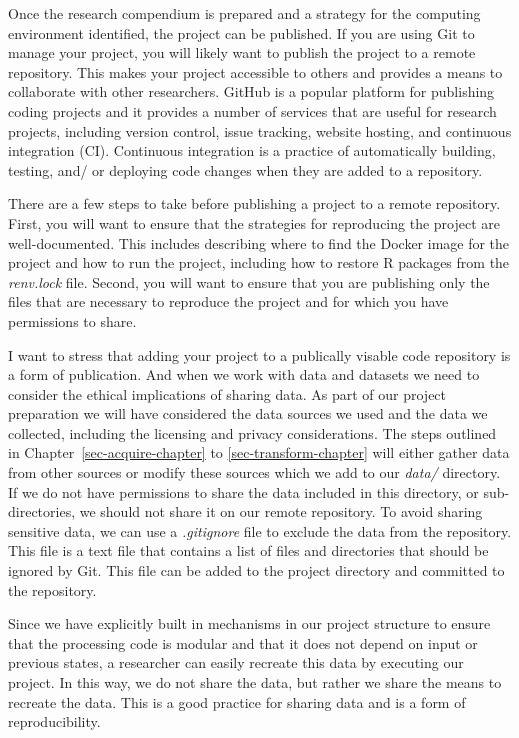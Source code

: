 \documentclass[
  letterpaper,
  krantz1]{latex/krantz-mod}
\theoremstyle{definition}
\theoremstyle{definition}
\theoremstyle{remark}
\begin{document}
Once the research compendium is prepared and a strategy for the
computing environment identified, the project can be published. If you
are using Git to manage your project, you will likely want to publish
the project to a remote repository. This makes your project accessible
to others and provides a means to collaborate with other researchers.
GitHub is a popular platform for publishing coding projects and it
provides a number of services that are useful for research projects,
including version control, issue tracking, website hosting, and
continuous integration (CI). Continuous integration is a practice of
automatically building, testing, and/ or deploying code changes when
they are added to a repository.

There are a few steps to take before publishing a project to a remote
repository. First, you will want to ensure that the strategies for
reproducing the project are well-documented. This includes describing
where to find the Docker image for the project and how to run the
project, including how to restore R packages from the \emph{renv.lock}
file. Second, you will want to ensure that you are publishing only the
files that are necessary to reproduce the project and for which you have
permissions to share.

I want to stress that adding your project to a publically visable code
repository is a form of publication. And when we work with data and
datasets we need to consider the ethical implications of sharing data.
As part of our project preparation we will have considered the data
sources we used and the data we collected, including the licensing and
privacy considerations. The steps outlined in
Chapter~\ref{sec-acquire-chapter} to \ref{sec-transform-chapter} will
either gather data from other sources or modify these sources which we
add to our \emph{data/} directory. If we do not have permissions to
share the data included in this directory, or sub-directories, we should
not share it on our remote repository. To avoid sharing sensitive data,
we can use a \emph{.gitignore} file to exclude the data from the
repository. This file is a text file that contains a list of files and
directories that should be ignored by Git. This file can be added to the
project directory and committed to the repository.

Since we have explicitly built in mechanisms in our project structure to
ensure that the processing code is modular and that it does not depend
on input or previous states, a researcher can easily recreate this data
by executing our project. In this way, we do not share the data, but
rather we share the means to recreate the data. This is a good practice
for sharing data and is a form of reproducibility.
\end{document}

